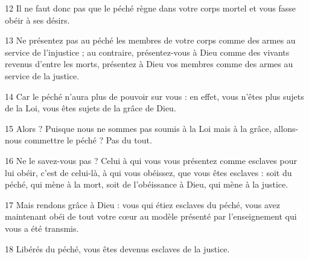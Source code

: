 
12 Il ne faut donc pas que le péché règne dans votre corps mortel et vous fasse obéir à ses désirs.

13 Ne présentez pas au péché les membres de votre corps comme des armes au service de l’injustice ; au contraire, présentez-vous à Dieu comme des vivants revenus d’entre les morts, présentez à Dieu vos membres comme des armes au service de la justice.

14 Car le péché n’aura plus de pouvoir sur vous : en effet, vous n’êtes plus sujets de la Loi, vous êtes sujets de la grâce de Dieu.

15 Alors ? Puisque nous ne sommes pas soumis à la Loi mais à la grâce, allons-nous commettre le péché ? Pas du tout.

16 Ne le savez-vous pas ? Celui à qui vous vous présentez comme esclaves pour lui obéir, c’est de celui-là, à qui vous obéissez, que vous êtes esclaves : soit du péché, qui mène à la mort, soit de l’obéissance à Dieu, qui mène à la justice.

17 Mais rendons grâce à Dieu : vous qui étiez esclaves du péché, vous avez maintenant obéi de tout votre cœur au modèle présenté par l’enseignement qui vous a été transmis.

18 Libérés du péché, vous êtes devenus esclaves de la justice.